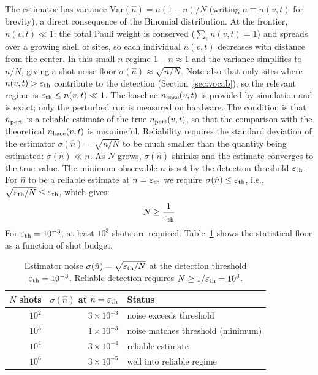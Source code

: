 \documentclass[11pt]{article}
\begin{document}
The estimator has variance $\mathrm{Var}(\hat{n}) = n(1-n)/N$ (writing
$n \equiv n(v,t)$ for brevity), a direct consequence of the Binomial distribution. At the frontier, $n(v,t) \ll 1$:
the total Pauli weight is conserved ($\sum_v n(v,t) = 1$) and spreads over
a growing shell of sites, so each individual $n(v,t)$ decreases with distance
from the center. In this small-$n$ regime $1-n \approx 1$ and the variance
simplifies to $n/N$, giving a shot noise floor $\sigma(\hat{n}) \approx \sqrt{n/N}$.
Note also that only sites where $n(v,t) > \varepsilon_{\rm th}$ contribute
to the detection (Section~\ref{sec:vocab}), so the relevant regime is
$\varepsilon_{\rm th} \leq n(v,t) \ll 1$.
The baseline $n_{\rm base}(v,t)$ is provided by simulation and is exact; only
the perturbed run is measured on hardware. The condition is that
$\hat{n}_{\rm pert}$ is a reliable estimate of the true $n_{\rm pert}(v,t)$,
so that the comparison with the theoretical $n_{\rm base}(v,t)$ is meaningful.
Reliability requires the standard deviation of the estimator $\sigma(\hat{n})
= \sqrt{n/N}$ to be much smaller than the quantity being estimated: $\sigma(\hat{n}) \ll n$.
As $N$ grows, $\sigma(\hat{n})$ shrinks and the estimate converges to the true value.
The minimum observable $n$ is set by the detection threshold $\varepsilon_{\rm th}$.
For $\hat{n}$ to be a reliable estimate at $n = \varepsilon_{\rm th}$ we require
$\sigma(\hat{n}) \leq \varepsilon_{\rm th}$, i.e.,
$\sqrt{\varepsilon_{\rm th}/N} \leq \varepsilon_{\rm th}$, which gives:
\begin{equation}
    N \geq \frac{1}{\varepsilon_{\rm th}}
\end{equation}
For $\varepsilon_{\rm th} = 10^{-3}$, at least $10^3$ shots are required.
Table~\ref{tab:shots} shows the statistical floor as a function of shot budget.

\begin{table}[h]
\centering
\small
\begin{tabular}{rrl}
\toprule
$N$ shots & $\sigma(\hat{n})$ at $n=\varepsilon_{\rm th}$ & Status \\
\midrule
$10^2$   & $3 \times 10^{-3}$ & noise exceeds threshold \\
$10^3$   & $1 \times 10^{-3}$ & noise matches threshold (minimum) \\
$10^4$   & $3 \times 10^{-4}$ & reliable estimate \\
$10^6$   & $3 \times 10^{-5}$ & well into reliable regime \\
\bottomrule
\end{tabular}
\caption{Estimator noise $\sigma(\hat{n}) = \sqrt{\varepsilon_{\rm th}/N}$
at the detection threshold $\varepsilon_{\rm th} = 10^{-3}$.
Reliable detection requires $N \geq 1/\varepsilon_{\rm th} = 10^3$.}
\label{tab:shots}
\end{table}
\end{document}
